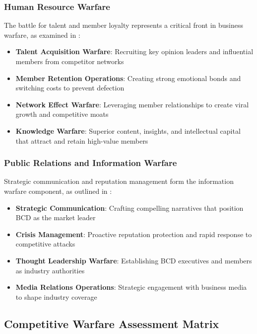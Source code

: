 \subsubsection{Human Resource Warfare}

The battle for talent and member loyalty represents a critical front in business warfare, as examined in \citep{wang_user_behavior_analysis}:

\begin{itemize}
    \item \textbf{Talent Acquisition Warfare}: Recruiting key opinion leaders and influential members from competitor networks
    \item \textbf{Member Retention Operations}: Creating strong emotional bonds and switching costs to prevent defection
    \item \textbf{Network Effect Warfare}: Leveraging member relationships to create viral growth and competitive moats
    \item \textbf{Knowledge Warfare}: Superior content, insights, and intellectual capital that attract and retain high-value members
\end{itemize}

\subsubsection{Public Relations and Information Warfare}

Strategic communication and reputation management form the information warfare component, as outlined in \citep{patricia_value_proposition_design}:

\begin{itemize}
    \item \textbf{Strategic Communication}: Crafting compelling narratives that position BCD as the market leader
    \item \textbf{Crisis Management}: Proactive reputation protection and rapid response to competitive attacks
    \item \textbf{Thought Leadership Warfare}: Establishing BCD executives and members as industry authorities
    \item \textbf{Media Relations Operations}: Strategic engagement with business media to shape industry coverage
\end{itemize}

\subsection{Competitive Warfare Assessment Matrix}

